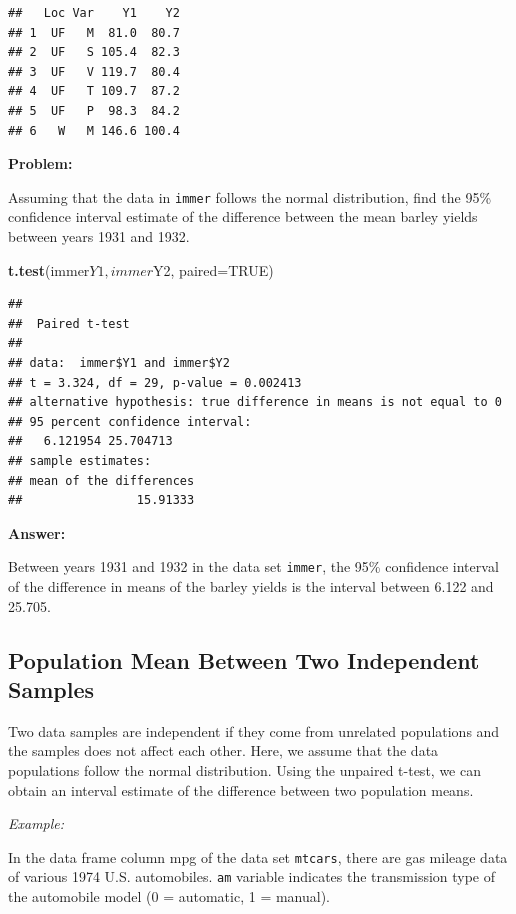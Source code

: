 \documentclass[]{article}
\newenvironment{Shaded}{\begin{snugshade}}{\end{snugshade}}
\newcommand{\KeywordTok}[1]{\textcolor[rgb]{0.13,0.29,0.53}{\textbf{{#1}}}}
\newcommand{\DataTypeTok}[1]{\textcolor[rgb]{0.13,0.29,0.53}{{#1}}}
\newcommand{\OtherTok}[1]{\textcolor[rgb]{0.56,0.35,0.01}{{#1}}}
\newcommand{\NormalTok}[1]{{#1}}
\numberwithin{equation}{section}
\begin{document}
\begin{verbatim}
##   Loc Var    Y1    Y2
## 1  UF   M  81.0  80.7
## 2  UF   S 105.4  82.3
## 3  UF   V 119.7  80.4
## 4  UF   T 109.7  87.2
## 5  UF   P  98.3  84.2
## 6   W   M 146.6 100.4
\end{verbatim}

\textbf{Problem:}

Assuming that the data in \texttt{immer} follows the normal
distribution, find the 95\% confidence interval estimate of the
difference between the mean barley yields between years 1931 and 1932.

\begin{Shaded}
\begin{Highlighting}[]
\KeywordTok{t.test}\NormalTok{(immer$Y1, immer$Y2, }\DataTypeTok{paired=}\OtherTok{TRUE}\NormalTok{) }
\end{Highlighting}
\end{Shaded}

\begin{verbatim}
## 
##  Paired t-test
## 
## data:  immer$Y1 and immer$Y2
## t = 3.324, df = 29, p-value = 0.002413
## alternative hypothesis: true difference in means is not equal to 0
## 95 percent confidence interval:
##   6.121954 25.704713
## sample estimates:
## mean of the differences 
##                15.91333
\end{verbatim}

\textbf{Answer:}

Between years 1931 and 1932 in the data set \texttt{immer}, the 95\%
confidence interval of the difference in means of the barley yields is
the interval between 6.122 and 25.705.

\hypertarget{population-mean-between-two-independent-samples}{\subsection{Population
Mean Between Two Independent
Samples}\label{population-mean-between-two-independent-samples}}

Two data samples are independent if they come from unrelated populations
and the samples does not affect each other. Here, we assume that the
data populations follow the normal distribution. Using the unpaired
t-test, we can obtain an interval estimate of the difference between two
population means.

\emph{Example:}

In the data frame column mpg of the data set \texttt{mtcars}, there are
gas mileage data of various 1974 U.S. automobiles. \texttt{am} variable
indicates the transmission type of the automobile model (0 = automatic,
1 = manual).
\end{document}
